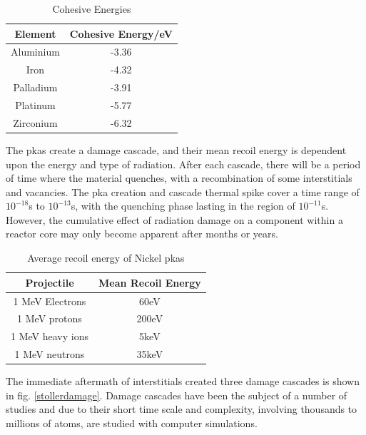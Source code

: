 \begin{table}[h]
\begin{center}
\renewcommand{\arraystretch}{1.2}
\begin{tabular}{c c}
\hline\hline
Element & Cohesive Energy/eV \\
\hline\hline
Aluminium & -3.36 \\
Iron & -4.32 \\
Palladium & -3.91 \\
Platinum & -5.77 \\
Zirconium & -6.32 \\
\hline\hline
\end{tabular}
\end{center}
\caption{Cohesive Energies \cite{shengeamonline}}
\label{table:cohesiveexamples}
\end{table}

The \acrshort{pka}s create a damage cascade, and their mean recoil energy is dependent upon the energy and type of radiation.  After each cascade, there will be a period of time where the material quenches, with a recombination of some interstitials and vacancies.  The \acrshort{pka} creation and cascade thermal spike cover a time range of $10^{-18}$s to $10^{-13}$s, with the quenching phase lasting in the region of $10^{-11}$s.  However, the cumulative effect of radiation damage on a component within a reactor core may only become apparent after months or years.

\begin{table}[h]
\begin{center}
\renewcommand{\arraystretch}{1.2}
\begin{tabular}{c c}
\hline\hline
Projectile & Mean Recoil Energy \\
\hline\hline
1 MeV Electrons & 60eV \\
1 MeV protons & 200eV \\
1 MeV heavy ions & 5keV \\
1 MeV neutrons & 35keV \\
\hline\hline
\end{tabular}
\end{center}
\caption{Average recoil energy of Nickel \acrshort{pka}s\cite{gswas}}
\end{table}

The immediate aftermath of interstitials created three damage cascades is shown in fig. \ref{stollerdamage}.  Damage cascades have been the subject of a number of studies and due to their short time scale and complexity, involving thousands to millions of atoms, are studied with computer simulations.

